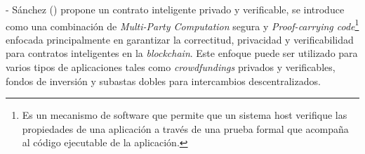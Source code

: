     

    - Sánchez (\citeyear{sanchez2020}) propone un contrato inteligente privado y verificable, se introduce 
    como una combinación de \textit{Multi-Party 
    Computation} segura y \textit{Proof-carrying code}\footnote{Es un mecanismo de software que permite que 
    un sistema host verifique las 
    propiedades de una aplicación a través de una prueba formal que acompaña al código ejecutable de la 
    aplicación.} enfocada 
    principalmente en garantizar la correctitud, privacidad y 
    verificabilidad para contratos inteligentes en la \textit{blockchain}. Este enfoque puede ser utilizado 
    para varios tipos de aplicaciones tales
    como \textit{crowdfundings} privados y verificables, fondos de inversión y subastas dobles para 
    intercambios descentralizados.


